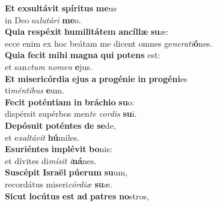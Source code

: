 \evenverse \textbf{Et} \textbf{ex}\textbf{sul}\textbf{tá}\textbf{vit} \textbf{spí}\textbf{ri}\textbf{tus} \textbf{me}us~\*\\
\evenverse in Deo sa\textit{lu}\textit{tá}\textit{ri} \textbf{me}o.\\
\oddverse \textbf{Qui}\textbf{a} \textbf{re}\textbf{spé}\textbf{xit} \textbf{hu}\textbf{mi}\textbf{li}\textbf{tá}\textbf{tem} \textbf{an}\textbf{cíl}\textbf{læ} \textbf{su}æ:~\*\\
\oddverse ecce enim ex hoc beátam me dicent omnes ge\textit{ne}\textit{ra}\textit{ti}\textbf{ó}nes.\\
\evenverse \textbf{Qui}\textbf{a} \textbf{fe}\textbf{cit} \textbf{mi}\textbf{hi} \textbf{ma}\textbf{gna} \textbf{qui} \textbf{po}\textbf{tens} est:~\*\\
\evenverse et san\textit{ctum} \textit{no}\textit{men} \textbf{e}jus.\\
\oddverse \textbf{Et} \textbf{mi}\textbf{se}\textbf{ri}\textbf{cór}\textbf{di}\textbf{a} \textbf{e}\textbf{jus} \textbf{a} \textbf{pro}\textbf{gé}\textbf{ni}\textbf{e} \textbf{in} \textbf{pro}\textbf{gé}\textbf{ni}es~\*\\
\oddverse ti\textit{mén}\textit{ti}\textit{bus} \textbf{e}um.\\
\evenverse \textbf{Fe}\textbf{cit} \textbf{po}\textbf{tén}\textbf{ti}\textbf{am} \textbf{in} \textbf{brá}\textbf{chi}\textbf{o} \textbf{su}o:~\*\\
\evenverse dispérsit supérbos men\textit{te} \textit{cor}\textit{dis} \textbf{su}i.\\
\oddverse \textbf{De}\textbf{pó}\textbf{su}\textbf{it} \textbf{po}\textbf{tén}\textbf{tes} \textbf{de} \textbf{se}de,~\*\\
\oddverse et e\textit{xal}\textit{tá}\textit{vit} \textbf{hú}miles.\\
\evenverse \textbf{E}\textbf{su}\textbf{ri}\textbf{én}\textbf{tes} \textbf{im}\textbf{plé}\textbf{vit} \textbf{bo}nis:~\*\\
\evenverse et dívites di\textit{mí}\textit{sit} \textit{i}\textbf{ná}nes.\\
\oddverse \textbf{Su}\textbf{scé}\textbf{pit} \textbf{Is}\textbf{ra}\textbf{ël} \textbf{pú}\textbf{e}\textbf{rum} \textbf{su}um,~\*\\
\oddverse recordátus miseri\textit{cór}\textit{di}\textit{æ} \textbf{su}æ.\\
\evenverse \textbf{Si}\textbf{cut} \textbf{lo}\textbf{cú}\textbf{tus} \textbf{est} \textbf{ad} \textbf{pa}\textbf{tres} \textbf{no}stros,~\*\\
